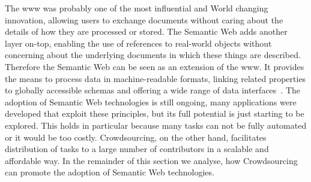 The \gls{www} was probably one of the most influential and World changing innovation, allowing users to exchange documents without caring about the details of how they are processed or stored. The Semantic Web adds another layer on-top, enabling the use of references to real-world objects without concerning about the underlying documents in which these things are described. Therefore the Semantic Web can be seen as an extension of the \gls{www}. It provides the means to process data in machine-readable formats, linking related properties to globally accessible schemas and offering a wide range of data interfaces~\cite{hendler2010}.
The adoption of Semantic Web technologies is still ongoing, many applications were developed that exploit these principles, but its full potential is just starting to be explored. This holds in particular because many tasks can not be fully automated or it would be too costly. Crowdsourcing, on the other hand, facilitates distribution of tasks to a large number of contributors in a scalable and affordable way. In the remainder of this section we analyse, how Crowdsourcing can promote the adoption of Semantic Web technologies. 

